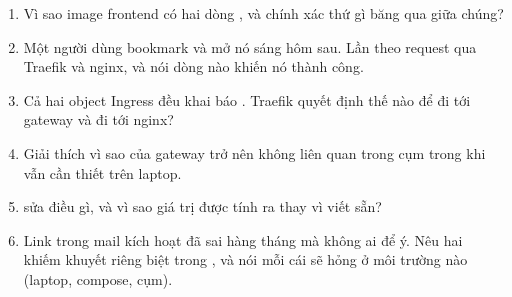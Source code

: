 \begin{quiz}
\begin{enumerate}
  \item Vì sao image frontend có hai dòng , và chính xác
  thứ gì băng qua giữa chúng?
  \item Một người dùng bookmark  và mở
  nó sáng hôm sau. Lần theo request qua Traefik và nginx, và nói dòng
  nào khiến nó thành công.
  \item Cả hai object Ingress đều khai báo .
  Traefik quyết định thế nào để  đi tới gateway và
   đi tới nginx?
  \item Giải thích vì sao  của gateway trở nên không
  liên quan trong cụm trong khi vẫn cần thiết trên laptop.
  \item {} sửa
  điều gì, và vì sao giá trị được tính ra thay vì viết sẵn?
  \item Link trong mail kích hoạt đã sai hàng tháng mà không ai để ý.
  Nêu hai khiếm khuyết riêng biệt trong
  , và nói mỗi
  cái sẽ hỏng ở môi trường nào (laptop, compose, cụm).
\end{enumerate}
\end{quiz}
